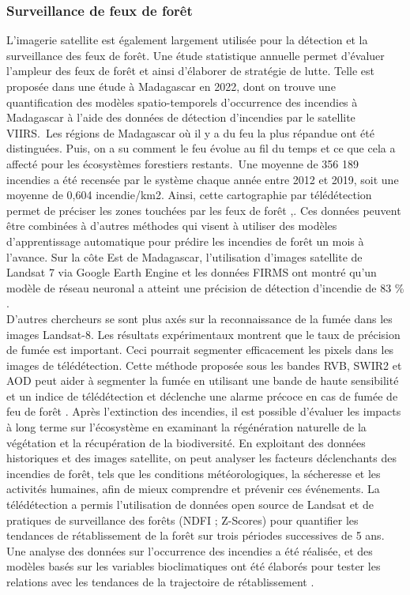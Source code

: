 \subsubsection{Surveillance de feux de forêt}
L’imagerie satellite est également largement utilisée pour la détection et la surveillance des feux de forêt. Une étude statistique annuelle permet d’évaluer l’ampleur des feux de forêt et ainsi d’élaborer de stratégie de lutte. Telle est proposée dans une étude à Madagascar en 2022, dont on trouve une quantification des modèles spatio-temporels d’occurrence des incendies à Madagascar à l’aide des données de détection d’incendies par le satellite VIIRS. Les régions de Madagascar où il y a du feu la plus répandue ont été distinguées. Puis, on a su comment le feu évolue au fil du temps et ce que cela a affecté pour les écosystèmes forestiers restants. Une moyenne de 356 189 incendies a été recensée par le système chaque année entre 2012 et 2019, soit une moyenne de 0,604 incendie/km2. Ainsi, cette cartographie par télédétection permet de préciser les zones touchées par les feux de forêt \cite{37},\cite{38}.
Ces données peuvent être combinées à d’autres méthodes qui visent à utiliser des modèles d'apprentissage automatique pour prédire les incendies de forêt un mois à l'avance. Sur la côte Est de Madagascar, l’utilisation d’images satellite de Landsat 7 via Google Earth Engine et les données FIRMS ont montré qu’un modèle de réseau neuronal a atteint une précision de détection d'incendie de 83 \% \cite{39}.
\\

D’autres chercheurs se sont plus axés sur la reconnaissance de la fumée dans les images Landsat-8. Les résultats expérimentaux montrent que le taux de précision de fumée est important. Ceci pourrait segmenter efficacement les pixels dans les images de télédétection. Cette méthode proposée sous les bandes RVB, SWIR2 et AOD peut aider à segmenter la fumée en utilisant une bande de haute sensibilité et un indice de télédétection et déclenche une alarme précoce en cas de fumée de feu de forêt \cite{40}. 
Après l'extinction des incendies, il est possible d'évaluer les impacts à long terme sur l'écosystème en examinant la régénération naturelle de la végétation et la récupération de la biodiversité. En exploitant des données historiques et des images satellite, on peut analyser les facteurs déclenchants des incendies de forêt, tels que les conditions météorologiques, la sécheresse et les activités humaines, afin de mieux comprendre et prévenir ces événements. La télédétection a permis l'utilisation de données open source de Landsat et de pratiques de surveillance des forêts (NDFI ; Z-Scores) pour quantifier les tendances de rétablissement de la forêt sur trois périodes successives de 5 ans. Une analyse des données sur l'occurrence des incendies a été réalisée, et des modèles basés sur les variables bioclimatiques ont été élaborés pour tester les relations avec les tendances de la trajectoire de rétablissement \cite{41}.
\\

